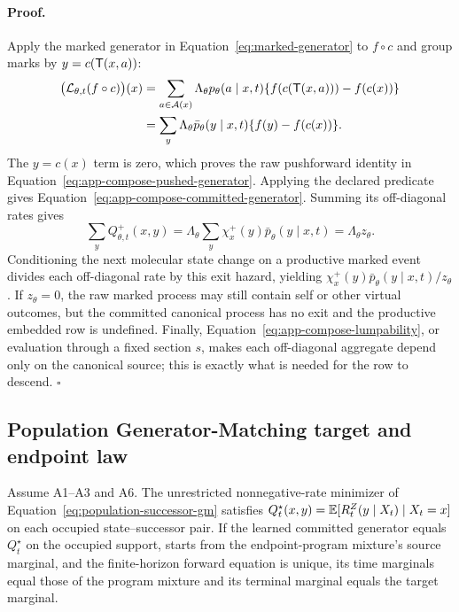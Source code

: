 \paragraph{Proof.}
Apply the marked generator in Equation~\eqref{eq:marked-generator} to
$f\circ c$ and group marks by $y=c(\mathsf{T}(x,a))$:
\begin{align}
  \bigl(\mathcal L_{\theta,t}(f\circ c)\bigr)(x)
  &=
  \sum_{a\in\mathcal{A}(x)}
  \Lambda_\theta p_\theta(a\mid x,t)
  \{f(c(\mathsf{T}(x,a)))-f(c(x))\} \notag\\
  &=
  \sum_y
  \Lambda_\theta\bar p_\theta(y\mid x,t)
  \{f(y)-f(c(x))\}.
\end{align}
The $y=c(x)$ term is zero, which proves the raw pushforward identity
in Equation~\eqref{eq:app-compose-pushed-generator}. Applying the declared
predicate gives Equation~\eqref{eq:app-compose-committed-generator}. Summing
its off-diagonal rates gives
\[
  \sum_yQ_{\theta,t}^{+}(x,y)
  =
  \Lambda_\theta
  \sum_y\chi_x^+(y)\bar p_\theta(y\mid x,t)
  =
  \Lambda_\theta z_\theta.
\]
Conditioning the next molecular state change on a productive marked event
divides each off-diagonal rate by this exit hazard, yielding
$\chi_x^+(y)\bar p_\theta(y\mid x,t)/z_\theta$. If $z_\theta=0$, the raw
marked process may still contain self or other virtual outcomes, but the
committed canonical process has no exit and the productive embedded row is
undefined. Finally,
Equation~\eqref{eq:app-compose-lumpability}, or evaluation through a fixed
section $s$, makes each off-diagonal aggregate depend only on the canonical
source; this is exactly what is needed for the row to descend.
\hfill$\square$

\subsection{Population Generator-Matching target and endpoint law}
\label{sec:app-compose-population-proof}

\begin{composeappendixproposition}
\label{prop:app-compose-population}
Assume A1--A3 and A6. The unrestricted nonnegative-rate minimizer of
Equation~\eqref{eq:population-successor-gm} satisfies
$Q_t^\star(x,y)=
\mathbb{E}[R_t^Z(y\mid X_t)\mid X_t=x]$ on each occupied state--successor pair. If
the learned committed generator equals $Q_t^\star$ on the occupied support,
starts from the endpoint-program mixture's source marginal, and the
finite-horizon forward equation is unique, its time marginals equal those of
the program mixture and its terminal marginal equals the target marginal.
\end{composeappendixproposition}

